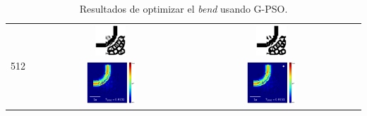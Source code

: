 \begin{table}[ht]
\begin{tabular}{|c|c|c|c|}
    \hline
      \multirow{2}{*}{512} &
      \includegraphics[width=0.20\textwidth]{image/results/bend/PSO/visualize_eps_cont_512.png} &
      \includegraphics[width=0.20\textwidth]{image/results/bend/PSO/visualize_eps_disc_512.png} \\
      \cline{2-4}
      &
      \includegraphics[width=0.33\textwidth]{image/results/bend/PSO/visualize_field_cont_512.png} &
      \includegraphics[width=0.33\textwidth]{image/results/bend/PSO/visualize_field_disc_512.png} \\
    \hline
    \end{tabular}
    \hspace*{-3cm}
    \caption{Resultados de optimizar el \emph{bend} usando G-PSO.}
    \label{tab:opt-PSO-bend}
\end{table}



